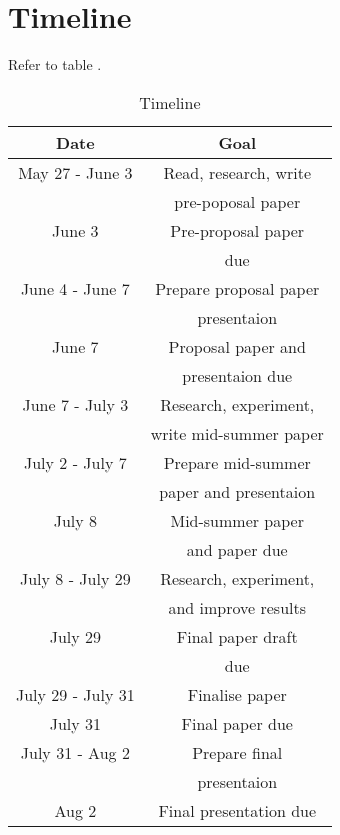 \section{Timeline}
\label{sec:timeline}

Refer to table .

\begin{table}[!ht]
	\centering
	
	\begin{tabular}{|c|c|}
		\hline
		\textbf{Date} & \textbf{Goal} \\
		\hline
		May 27 - June 3 & Read, research, write \\
		& pre-poposal paper \\
		\hline
		June 3 & Pre-proposal paper \\
		& due \\
		\hline
		June 4 - June 7 & Prepare proposal paper \\
		& presentaion \\
		\hline
		June 7 & Proposal paper and \\
		& presentaion due \\
		\hline
		June 7 - July 3 & Research, experiment, \\
		& write mid-summer paper \\
		\hline
		July 2 - July 7 & Prepare mid-summer \\
		& paper and presentaion \\
		\hline
		July 8 & Mid-summer paper \\
		& and paper due \\
		\hline
		July 8 - July 29 & Research, experiment, \\
		& and improve results \\
		\hline
		July 29 & Final paper draft \\
		& due \\
		\hline
		July 29 - July 31 & Finalise paper \\
		\hline
		July 31 & Final paper due \\
		\hline
		July 31 - Aug 2 & Prepare final \\
		& presentaion \\
		\hline
		Aug 2 & Final presentation due \\
		\hline
	\end{tabular}

\caption{Timeline}
\label{tab:timeline}
\end{table}
